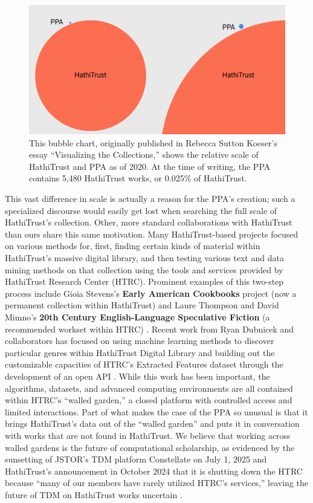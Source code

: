 \documentclass{anthology-ch}         %
\begin{document}
\begin{figure}
    \centering
    \includegraphics[width=0.75\linewidth]{figures/bubble-chart.png}
    \caption{This bubble chart, originally published in Rebecca Sutton Koeser’s essay “Visualizing the Collections,”\cite{koeser_visualizing_2020} shows the relative scale of HathiTrust and PPA as of 2020. At the time of writing, the PPA contains 5,480 HathiTrust works, or 0.025\% of HathiTrust.}
    \label{fig:bubble-chart}
\end{figure}

This vast difference in scale is actually a reason for the PPA’s creation; such a specialized discourse would easily get lost when searching the full scale of HathiTrust’s collection. Other, more standard collaborations with HathiTrust than ours share this same motivation. Many HathiTrust-based projects focused on various methods for, first, finding certain kinds of material within HathiTrust’s massive digital library, and then testing various text and data mining methods on that collection using the tools and services provided by HathiTrust Research Center (HTRC)\cite{noauthor_hathitrust_nodate}. Prominent examples of this two-step process include Gioia Stevens’s \textbf{Early American Cookbooks} project (now a permanent collection within HathiTrust) \cite{stevens_new_2017} and Laure Thompson and David Mimno’s \textbf{20th Century English-Language Speculative Fiction }(a recommended workset within HTRC) \cite{thompson_building_nodate, 
noauthor_recommended_nodate}. Recent work from Ryan Dubnicek and collaborators has focused on using machine learning methods to discover particular genres within HathiTrust Digital Library \cite{parulian_uncovering_2022, dubnicek_ryan_piloting_2023} and building out the customizable capacities of HTRC’s Extracted Features dataset through the development of an open API \cite{john_a_walsh_library_nodate}. While this work has been important, the algorithms, datasets, and advanced computing environments are all contained within HTRC’s “walled garden,” a closed platform with controlled access and limited interactions. Part of what makes the case of the PPA so unusual is that it brings HathiTrust’s data out of the “walled garden” and puts it in conversation with works that are not found in HathiTrust. We believe that working across walled gardens is the future of computational scholarship, as evidenced by the sunsetting of JSTOR’s TDM platform Constellate on July 1, 2025 \cite{noauthor_constellate_2019} and HathiTrust’s announcement in October 2024 that it is shutting down the HTRC because “many of our members have rarely utilized HTRC’s services,” leaving the future of TDM on HathiTrust works uncertain \cite{noauthor_plans_nodate}.
\end{document}

